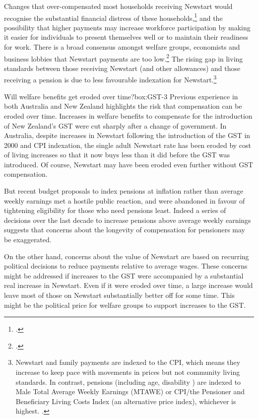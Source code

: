 Changes that over-compensated most households receiving Newstart would recognise the substantial financial distress of these households,\footcite[][18--19]{DaleyMcGannonSavageEtAl2013BalancingBudgets}  and the possibility that higher payments may increase workforce participation by making it easier for individuals to present themselves well or to maintain their readiness for work.  There is a broad consensus amongst welfare groups, economists and business lobbies that Newstart payments are too low.\footcite[][3]{BCA2012}  The rising gap in living standards between those receiving Newstart (and other allowances) and those receiving a pension is due to less favourable indexation for Newstart.\footnote{Newstart and family payments are indexed to the CPI, which means they increase to keep pace with movements in prices but not community living standards. In contrast, pensions (including age, disability \etc) are indexed to Male Total Average Weekly Earnings (MTAWE) or CPI/the Pensioner and Beneficiary Living Costs Index (an alternative price index), whichever is highest. \textcite{DSS2015}. } 



\begin{smallbox}{Will welfare benefits get eroded over time?}{box:GST-3}
Previous experience in both Australia and New Zealand highlights the risk that compensation can be eroded over time. Increases in welfare benefits to compensate for the introduction of New Zealand’s GST were cut sharply after a change of government. In Australia, despite increases in Newstart following the introduction of the GST in 2000 and CPI indexation, the single adult Newstart rate has been eroded by cost of living increases so that it now buys less than it did before the GST was introduced.  Of course, Newstart may have been eroded even further without GST compensation.

But recent budget proposals to index pensions at inflation rather than average weekly earnings met a hostile public reaction, and were abandoned in favour of tightening eligibility for those who need pensions least.  Indeed a series of decisions over the last decade to increase pensions above average weekly earnings  suggests that concerns about the longevity of compensation for pensioners may be exaggerated.

On the other hand, concerns about the value of Newstart are based on recurring political decisions to reduce payments relative to average wages. These concerns might be addressed if increases to the GST were accompanied by a substantial real increase in Newstart. Even if it were eroded over time, a large increase would leave most of those on Newstart substantially better off for some time. This might be the political price for welfare groups to support increases to the GST. 
\end{smallbox} 

